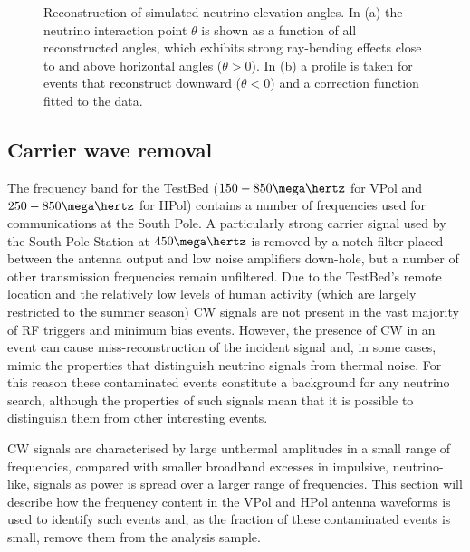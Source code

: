 \begin{figure}[htpb]
  \hfill
  \caption{Reconstruction of simulated neutrino elevation angles. In (a) the neutrino interaction point $\theta$ is shown as a function of all reconstructed angles, which exhibits strong ray-bending effects close to and above horizontal angles ($\theta > 0 $). In (b) a profile is taken for events that reconstruct downward ($\theta < 0 $) and a correction function fitted to the data.}
  \label{fig:analysis:Reconstruct:AraSim-Theta-Correction}
\end{figure}


\subsection{Carrier wave removal}
\label{sec:Analysis:CWRemoval}

The frequency band for the TestBed ($150 - 850 \mega \hertz$ for VPol and $250 - 850 \mega \hertz$ for HPol) contains a number of frequencies used for communications at the South Pole. A particularly strong carrier signal used by the South Pole Station at $450 \mega \hertz$ is removed by a notch filter placed between the antenna output and low noise amplifiers down-hole, but a number of other transmission frequencies remain unfiltered. Due to the TestBed's remote location and the relatively low levels of human activity (which are largely restricted to the summer season) CW signals are not present in the vast majority of RF triggers and minimum bias events. However, the presence of CW in an event can cause miss-reconstruction of the incident signal and, in some cases, mimic the properties that distinguish neutrino signals from thermal noise. For this reason these contaminated events constitute a background for any neutrino search, although the properties of such signals mean that it is possible to distinguish them from other interesting events. 

CW signals are characterised by large unthermal amplitudes in a small range of frequencies, compared with smaller broadband excesses in impulsive, neutrino-like, signals as power is spread over a larger range of frequencies. This section will describe how the frequency content in the VPol and HPol antenna waveforms is used to identify such events and, as the fraction of these contaminated events is small, remove them from the analysis sample.

